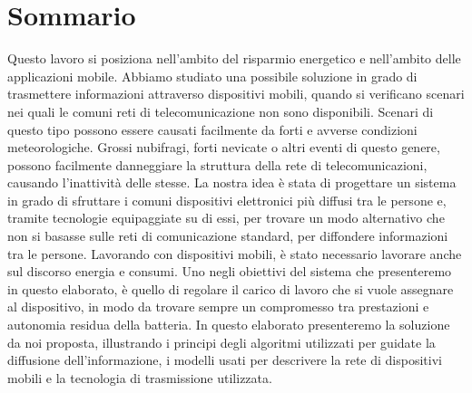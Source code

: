 
\begingroup
\let\clearpage\relax
\let\cleardoublepage\relax
\let\cleardoublepage\relax

\chapter*{Sommario}
Questo lavoro si posiziona nell'ambito del risparmio energetico e nell'ambito delle applicazioni mobile. Abbiamo studiato una possibile soluzione in grado di trasmettere informazioni attraverso dispositivi mobili, quando si verificano scenari nei quali le comuni reti di telecomunicazione non sono disponibili. Scenari di questo tipo possono essere causati facilmente da forti e avverse condizioni meteorologiche. Grossi nubifragi, forti nevicate o altri eventi di questo genere, possono facilmente danneggiare la struttura della rete di telecomunicazioni, causando l'inattività delle stesse. La nostra idea è stata di progettare un sistema in grado di sfruttare i comuni dispositivi elettronici più diffusi tra le persone e, tramite tecnologie equipaggiate su di essi, per trovare un modo alternativo che non si basasse sulle reti di comunicazione standard, per diffondere informazioni tra le persone. Lavorando con dispositivi mobili, è stato necessario lavorare anche sul discorso energia e consumi. Uno negli obiettivi del sistema che presenteremo in questo elaborato, è quello di regolare il carico di lavoro che si vuole assegnare al dispositivo, in modo da trovare sempre un compromesso tra prestazioni e autonomia residua della batteria.
In questo elaborato presenteremo la soluzione da noi proposta, illustrando i principi degli algoritmi utilizzati per guidate la diffusione dell'informazione, i modelli usati per descrivere la rete di dispositivi mobili e la tecnologia di trasmissione utilizzata.
\endgroup